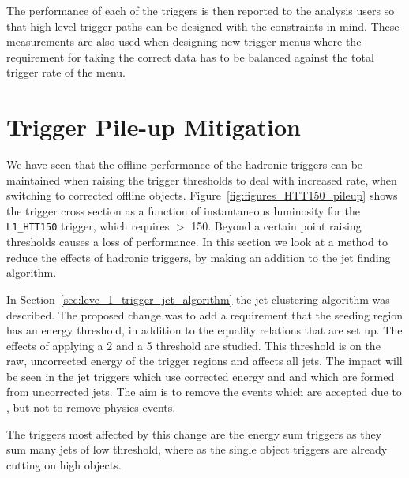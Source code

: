 The performance of each of the \Lone triggers is then reported to the analysis 
users so that high level trigger paths can be designed with the \Lone 
constraints in mind. These measurements are also used when designing new \Lone 
trigger menus where the requirement for taking the correct data has to be 
balanced against the total trigger rate of the \Lone menu.

\section{\Lone Trigger Pile-up Mitigation} %
\label{sub:lone_trigger_pile_up_mitigation}


We have seen that the offline performance of the \Lone hadronic triggers 
can be maintained when raising the trigger thresholds to deal with increased 
rate, when switching to \pu corrected offline objects. 
Figure~\ref{fig:figures_HTT150_pileup} shows the trigger cross section as a 
function of instantaneous luminosity for the \verb|L1_HTT150| trigger, which 
requires \HT $>$ \unit{150}{\GeV}. Beyond a certain point raising 
thresholds causes a loss of performance.
In this section we look at a method to reduce the effects of \pu hadronic 
\Lone triggers, by making an addition to the \Lone jet finding algorithm.

In Section~\ref{sec:leve_1_trigger_jet_algorithm} the \Lone jet clustering 
algorithm was described. The proposed change was to add a requirement that the 
seeding region has an energy threshold, in addition to the equality 
relations that are set up. The effects of applying a \unit{2}{\GeV} and a 
\unit{5}{\GeV} threshold are studied. This threshold is on the raw, uncorrected 
energy of the trigger regions and affects all \Lone jets. The impact will be 
seen in the \Lone jet triggers which use corrected energy and \Lone \HT and 
\HTm which are formed from uncorrected jets.
The aim is to remove the events which are accepted due to \pu, but not to 
remove physics events.

The triggers most affected by this change are the energy sum triggers as they 
sum many jets of low threshold, where as the single object triggers are already 
cutting on high \ET objects.

